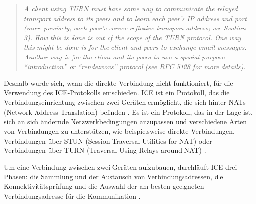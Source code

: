\begin{quote}
    \textit{A client using TURN must have some way to communicate the relayed transport address to its
    peers and to learn each peer's IP address and port (more precisely, each peer's server-reflexive
    transport address; see Section 3). How this is done is out of the scope of the TURN protocol. One
    way this might be done is for the client and peers to exchange email messages. Another way is
    for the client and its peers to use a special-purpose \enquote{introduction} or \enquote{rendezvous} protocol (see RFC 5128 for more details).} \parencite[S. 7]{rfc8656_TURN}
\end{quote}


\noindent Deshalb wurde sich, wenn die direkte Verbindung nicht funktioniert, für die Verwendung des ICE-Protokolls entschieden. ICE ist ein Protokoll, das die Verbindungseinrichtung zwischen zwei Geräten ermöglicht, die sich hinter NATs (Network Address Translation) befinden \parencite[S. 6 ff.]{rfc8445_ICE}. Es ist ein Protokoll, das in der Lage ist, sich an sich ändernde Netzwerkbedingungen anzupassen und verschiedene Arten von Verbindungen zu unterstützen, wie beispielsweise direkte Verbindungen, Verbindungen über STUN (Session Traversal Utilities for NAT) oder Verbindungen über TURN (Traversal Using Relays around NAT) \parencite[S. 1]{rfc8445_ICE}. 

Um eine Verbindung zwischen zwei Geräten aufzubauen, durchläuft ICE drei Phasen: die Sammlung und der Austausch von Verbindungsadressen, die Konnektivitätsprüfung und die Auswahl der am besten geeigneten Verbindungsadresse für die Kommunikation \parencite[S. 7 ff.]{rfc8445_ICE}.

